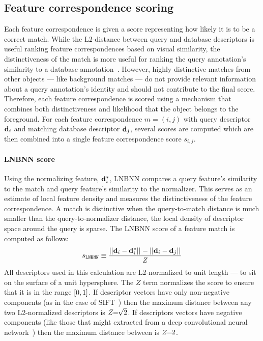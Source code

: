     \subsection{Feature correspondence scoring}
        Each feature correspondence is given a score representing how likely it is to be a correct match. While the
        L2-distance between query and database descriptors is useful ranking feature correspondences based on
        visual similarity, the distinctiveness of the match is more useful for ranking the query annotation's
        similarity to a database annotation~\cite{lowe_distinctive_2004, arandjelovic_dislocation_2015,
        mccann_local_2012}. However, highly distinctive matches from other objects --- like background matches ---
        do not provide relevant information about a query annotation's identity and should not contribute to the
        final score. Therefore, each feature correspondence is scored using a mechanism that combines both
        distinctiveness and likelihood that the object belongs to the foreground. For each feature correspondence
        $m = (i, j)$ with query descriptor $\mathbf{d}_i$ and matching database descriptor $\mathbf{d}_j$, several scores are
        computed which are then combined into a single feature correspondence score $s_{i,j}$.

        \paragraph{LNBNN score}\label{sec:lnbnnscore}

            Using the normalizing feature, $\mathbf{d}^{*}_{i}$, LNBNN compares a query feature's similarity to the
            match and query feature's similarity to the normalizer. This serves as an estimate of local feature
            density and measures the distinctiveness of the feature correspondence. A match is distinctive when the
            query-to-match distance is much smaller than the query-to-normalizer distance, \ie{} the local density
            of descriptor space around the query is sparse. The LNBNN score of a feature match is computed as
            follows:
            \begin{equation}\label{eqn:lnbnn}
                s_{\tt{LNBNN}} \equiv \frac{||\mathbf{d}_i - \mathbf{d}^{*}_{i}||_{} - ||\mathbf{d}_i - \mathbf{d}_j||_{}}{Z}
            \end{equation}
            All descriptors used in this calculation are L2-normalized to unit length --- \ie{} to sit on the
            surface of a unit hypersphere. The $Z$ term normalizes the score to ensure that it is in the range
            $[0, 1]$. If descriptor vectors have only non-negative components (as in the case of
            SIFT~\cite{lowe_distinctive_2004}) then the maximum distance between any two L2-normalized descriptors
            is $Z\mkern-6mu=\mkern-6mu\sqrt{2}$. If descriptors vectors have negative components (like those that might
            extracted from a deep convolutional neural network~\cite{zagoruyko_learning_2015}) then the maximum
            distance between is $Z\mkern-6mu=\mkern-6mu2$.

